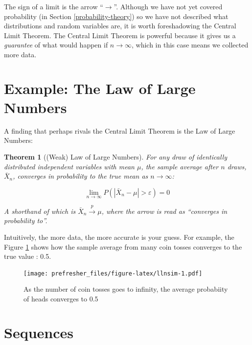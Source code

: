 \documentclass[
]{book}
\newtheorem{theorem}{Theorem}[chapter]
\theoremstyle{definition}
\theoremstyle{definition}
\theoremstyle{definition}
\theoremstyle{remark}
\begin{document}
The sign of a limit is the arrow ``\(\rightarrow\)''. Although we have not yet covered probability (in Section \ref{probability-theory}) so we have not described what distributions and random variables are, it is worth foreshadowing the Central Limit Theorem. The Central Limit Theorem is powerful because it gives us a \emph{guarantee} of what would happen if \(n \rightarrow \infty\), which in this case means we collected more data.

\hypertarget{example-the-law-of-large-numbers}{%
\section*{Example: The Law of Large Numbers}\label{example-the-law-of-large-numbers}}

A finding that perhaps rivals the Central Limit Theorem is the Law of Large Numbers:

\begin{theorem}[(Weak) Law of Large Numbers]
\protect\hypertarget{thm:lln-lim}{}{\label{thm:lln-lim} {} }For any draw of identically distributed independent variables with mean \(\mu\), the sample average after \(n\) draws, \(\bar{X}_n\), converges in probability to the true mean as \(n \rightarrow \infty\):

\[\lim\limits_{n\to \infty} P(|\bar{X}_n - \mu | > \varepsilon) = 0\]

A shorthand of which is \(\bar{X}_n \xrightarrow{p} \mu\), where the arrow is read as ``converges in probability to''.
\end{theorem}

Intuitively, the more data, the more accurate is your guess. For example, the Figure \ref{fig:llnsim} shows how the sample average from many coin tosses converges to the true value : 0.5.

\begin{figure}
\centering
\texttt{[image: prefresher\_files/figure-latex/llnsim-1.pdf]}
\caption{\label{fig:llnsim}As the number of coin tosses goes to infinity, the average probabiity of heads converges to 0.5}
\end{figure}

\hypertarget{sequences}{%
\section{Sequences}\label{sequences}}
\end{document}
